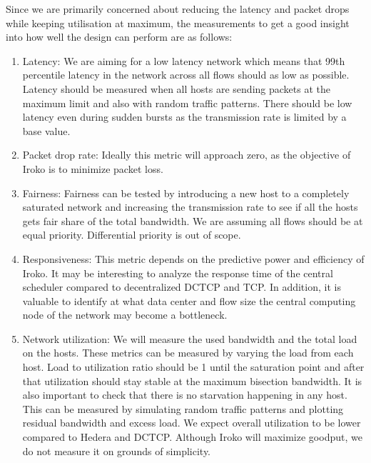 \documentclass[sigconf]{acmart}
\begin{document}
Since we are primarily concerned about reducing the latency and packet drops while keeping utilisation at maximum, the measurements to get a good insight into how well the design can perform are as follows:
\begin{enumerate}

\item Latency: We are aiming for a low latency network which means that 99th percentile latency in the network across all flows should as low as possible. Latency should be measured when all hosts are sending packets at the maximum limit and also with random traffic patterns. There should be low latency even during sudden bursts as the transmission rate is limited by a base value.

\item Packet drop rate: Ideally this metric will approach zero, as the objective of Iroko is to minimize packet loss.

\item Fairness: Fairness can be tested by introducing a new host to a completely saturated network and increasing the transmission rate to see if all the hosts gets fair share of the total bandwidth. We are assuming all flows should be at equal priority. Differential priority is out of scope.

\item Responsiveness: This metric depends on the predictive power and efficiency of Iroko. It may be interesting to analyze the response time of the central scheduler compared to decentralized DCTCP and TCP. In addition, it is valuable to identify at what data center and flow size the central computing node of the network may become a bottleneck.

\item Network utilization: We will measure the used bandwidth and the total load on the hosts. These metrics can be measured by varying the load from each host. Load to utilization ratio should be 1 until the saturation point and after that utilization should stay stable at the maximum bisection bandwidth.
It is also important to check that there is no starvation happening in any host. This can be measured by simulating random traffic patterns and plotting residual bandwidth and excess load. We expect overall utilization to be lower compared to Hedera and DCTCP. Although Iroko will maximize goodput, we do not measure it on grounds of simplicity.

\end{enumerate}
\end{document}
